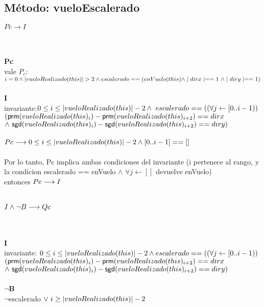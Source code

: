 \documentclass[a4paper]{article}
\begin{document}
    \subsection{M\'etodo: vueloEscalerado}
        \noindent
        \begin{Large}
        {$Pc \rightarrow I$}
        \end{Large}\\
        \\
        \textbf{Pc}\\
        vale $ P_c $: $ i = 0 \land \longitud{vueloRealizado(this)} > 2 \land escalerado == (enVuelo(this) \land \mid dirx \mid == 1 \ \land \mid diry \mid == 1) $ \\
        \\
		\textbf{I}\\
        invariante:$ 0 \leq i \leq \left| vueloRealizado(this) \right| -2 \land \ escalerado == ((\forall j \leftarrow [0..i -1)) $ $ (\mathsf{prm}(vueloRealizado(this)_i) - \mathsf{prm}(vueloRealizado(this)_{i+2}) == dirx $ $ \land \ \mathsf{sgd}(vueloRealizado(this)_i) - \mathsf{sgd}(vueloRealizado(this)_{i+2}) == diry) $ \\   
\\ $Pc \longrightarrow 0 \leq i \leq \left| vueloRealizado(this) \right| -2 \land [0..i-1] == []$ \\
\\ Por lo tanto, Pc implica ambas condiciones del invariante (i pertenece al rango, y la condicion escalerado == enVuelo $\land$ $\forall j \leftarrow []$ devuelve enVuelo) \\ entonces $Pc \longrightarrow I$ \\
\\
\begin{Large}
        {$I \land \neg B \longrightarrow Qc$}
        \end{Large}\\
        \\
        \textbf{I}\\
        invariante: $ 0 \leq i \leq \left| vueloRealizado(this) \right| -2 \land escalerado == ((\forall j \leftarrow [0..i -1)) $ $ (\mathsf{prm}(vueloRealizado(this)_i) - \mathsf{prm}(vueloRealizado(this)_{i+2}) == dirx $ $ \land \ \mathsf{sgd}(vueloRealizado(this)_i) - \mathsf{sgd}(vueloRealizado(this)_{i+2}) == diry) $ \\
        \\
        \textbf{$\neg$B}\\
        $\neg$escalerado$ \ \vee \ i \geq \left| vueloRealizado(this) \right| - 2$
       
\end{document}
